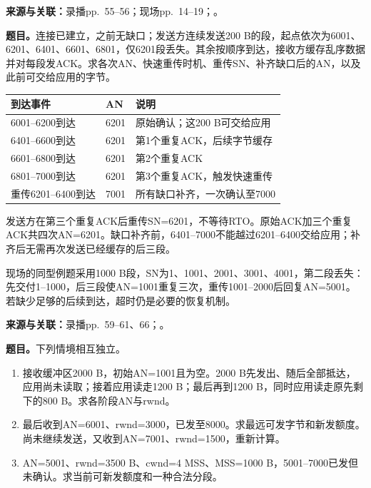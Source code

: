 
\textbf{来源与关联：}录播pp.~55--56；现场pp.~14--19；。

\textbf{题目。}连接已建立，之前无缺口；发送方连续发送200 B的段，起点依次为6001、6201、6401、6601、6801，仅6201段丢失。其余按顺序到达，接收方缓存乱序数据并对每段发ACK。求各次AN、快速重传时机、重传SN、补齐缺口后的AN，以及此前可交给应用的字节。

\begin{workedsolution}
\begin{center}
\small
\begin{tabularx}{\textwidth}{@{}llX@{}}
\toprule
到达事件 & AN & 说明 \\
\midrule
6001--6200到达 & 6201 & 原始确认；这200 B可交给应用 \\
6401--6600到达 & 6201 & 第1个重复ACK，后续字节缓存 \\
6601--6800到达 & 6201 & 第2个重复ACK \\
6801--7000到达 & 6201 & 第3个重复ACK，触发快速重传 \\
重传6201--6400到达 & 7001 & 所有缺口补齐，一次确认至7000 \\
\bottomrule
\end{tabularx}
\end{center}
发送方在第三个重复ACK后重传SN=6201，不等待RTO。原始ACK加三个重复ACK共四次AN=6201。缺口补齐前，6401--7000不能越过6201--6400交给应用；补齐后无需再次发送已经缓存的后三段。

现场的同型例题采用1000 B段，SN为1、1001、2001、3001、4001，第二段丢失：先交付1--1000，后三段使AN=1001重复三次，重传1001--2000后回复AN=5001。若缺少足够的后续到达，超时仍是必要的恢复机制。
\end{workedsolution}


\textbf{来源与关联：}录播pp.~59--61、66；。

\textbf{题目。}下列情境相互独立。
\begin{enumerate}[label=(\alph*)]
 \item 接收缓冲区2000 B，初始AN=1001且为空。2000 B先发出、随后全部抵达，应用尚未读取；接着应用读走1200 B；最后再到1200 B，同时应用读走原先剩下的800 B。求各阶段AN与rwnd。
 \item 最后收到AN=6001、rwnd=3000，已发至8000。求最远可发字节和新发额度。尚未继续发送，又收到AN=7001、rwnd=1500，重新计算。
 \item AN=5001、rwnd=3500 B、cwnd=4 MSS、MSS=1000 B，5001--7000已发但未确认。求当前可新发额度和一种合法分段。
\end{enumerate}

